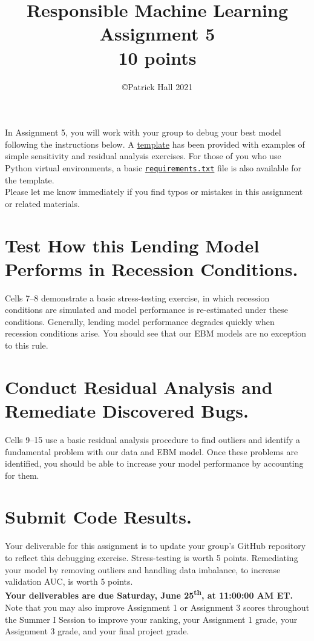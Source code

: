 \documentclass[fleqn]{article}
\title{Responsible Machine Learning\\\Large{Assignment 5}\\\Large{10 points}}
\author{\copyright Patrick Hall 2021}
\begin{document}
\maketitle

\noindent In Assignment 5, you will work with your group to debug your best model following the instructions below. A \href{https://nbviewer.jupyter.org/github/jphall663/GWU_rml/blob/master/assignments/assignment_5/assign_5_template.ipynb?flush_cache=true}{template} has been provided with examples of simple sensitivity and residual analysis exercises. For those of you who use Python virtual environments, a basic \href{https://github.com/jphall663/GWU_rml/blob/master/assignments/requirements.txt}{\texttt{requirements.txt}} file is also available for the template.\\

\noindent Please let me know immediately if you find typos or mistakes in this assignment or related materials. 

\section{Test How this Lending Model Performs in Recession Conditions.}

Cells 7--8 demonstrate a basic stress-testing exercise, in which recession conditions are simulated and model performance is re-estimated under these conditions. Generally, lending model performance degrades quickly when recession conditions arise. You should see that our EBM models are no exception to this rule.\\

\section{Conduct Residual Analysis and Remediate Discovered Bugs.}

Cells 9--15 use a basic residual analysis procedure to find outliers and identify a fundamental problem with our data and EBM model. Once these problems are identified, you should be able to increase your model performance by accounting for them.\\

\section{Submit Code Results.}

Your deliverable for this assignment is to update your group's GitHub repository to reflect this debugging exercise. Stress-testing is worth 5 points. Remediating your model by removing outliers and handling data imbalance, to increase validation AUC, is worth 5 points.\\

\noindent \textbf{Your deliverables are due Saturday, June 25\textsuperscript{th}, at 11:00:00 AM ET.}\\

\noindent Note that you may also improve Assignment 1 or Assignment 3 scores throughout the Summer I Session to improve your ranking, your Assignment 1 grade, your Assignment 3 grade, and your final project grade.
\end{document}
